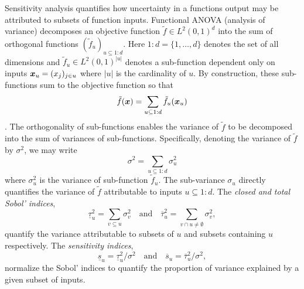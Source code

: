\documentclass{article}[12pt]
\begin{document}
Sensitivity analysis quantifies how uncertainty in a functions output may be attributed to subsets of function inputs. Functional ANOVA (analysis of variance) decomposes an objective function $\tilde{f} \in L^2(0,1)^{d}$ into the sum of orthogonal functions $(\tilde{f}_u)_{u \subseteq 1:d}$. Here $1:d=\{1,\dots,d\}$ denotes the set of all dimensions and $\tilde{f}_u \in L^2(0,1)^{\lvert u \rvert}$ denotes a sub-function dependent only on inputs $\boldsymbol{x}_u = (x_j)_{j \in u}$ where $\lvert u \rvert$ is the cardinality of $u$. By construction, these sub-functions sum to the objective function so that
\begin{equation}
    \tilde{f}(\boldsymbol{x}) = \sum_{u \subseteq 1:d} \tilde{f}_u(\boldsymbol{x}_u) \label{eq:fanova}
\end{equation}
\cite[Appendix A]{mcbook}. The orthogonality of sub-functions enables the variance of $\tilde{f}$ to be decomposed into the sum of variances of sub-functions. Specifically, denoting the variance of $\tilde{f}$ by $\sigma^2$, we may write
\begin{equation*}
    \sigma^2 = \sum_{u \subseteq 1:d} \sigma^2_u
\end{equation*}
where $\sigma^2_u$ is the variance of sub-function $\tilde{f}_u$. The sub-variance $\sigma_u$ directly quantifies the variance of $\tilde{f}$ attributable to inputs $u \subseteq 1:d$.  The \emph{closed and total Sobol' indices},
\begin{equation}
    \label{eq:sobol_indices}
    \underline{\tau}_u^2 = \sum_{v \subseteq u} \sigma^2_v \quad \text{and} \quad 
    \overline{\tau}_u^2 = \sum_{v \cap u \neq \emptyset} \sigma^2_v,
\end{equation}
quantify the variance attributable to subsets of $u$ and subsets containing $u$ respectively. The \emph{sensitivity indices},
\begin{equation}
    \label{eq:sensitivity_indices_og}
    \underline{s}_u = \underline{\tau}_u^2/\sigma^2 \quad \text{and} \quad 
    \overline{s}_u = \overline{\tau}_u^2/\sigma^2,
\end{equation}
normalize the Sobol' indices to quantify the proportion of variance explained by a given subset of inputs. 
\end{document}
